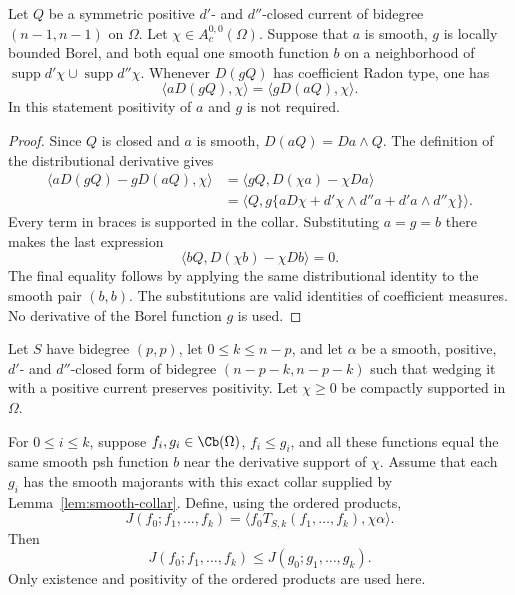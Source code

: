 \begin{lemma}
\label{lem:collar-green}
Let $Q$ be a symmetric positive $d'$- and $d''$-closed current of
bidegree $(n-1,n-1)$ on $\Omega$. Let $\chi\in A_c^{0,0}(\Omega)$.
Suppose that $a$ is smooth, $g$ is locally bounded Borel, and both equal
one smooth function $b$ on a neighborhood of
$\operatorname{supp}d'\chi\cup\operatorname{supp}d''\chi$.
Whenever $D(gQ)$ has coefficient Radon type, one has
\[
 \langle aD(gQ),\chi\rangle
 =\langle gD(aQ),\chi\rangle.
\]
In this statement positivity of $a$ and $g$ is not required.
\end{lemma}

\begin{proof}
Since $Q$ is closed and $a$ is smooth, $D(aQ)=Da\wedge Q$. The
definition of the distributional derivative gives
\begin{align*}
 \langle aD(gQ)-gD(aQ),\chi\rangle
  &=\langle gQ,D(\chi a)-\chi Da\rangle\\
  &=\langle Q,g\{aD\chi+d'\chi\wedge d''a
                         +d'a\wedge d''\chi\}\rangle.
\end{align*}
Every term in braces is supported in the collar. Substituting $a=g=b$
there makes the last expression
\[
 \langle bQ,D(\chi b)-\chi Db\rangle=0.
\]
The final equality follows by applying the same distributional identity
to the smooth pair $(b,b)$. The substitutions are valid identities of
coefficient measures. No derivative of the Borel function $g$ is used.
\end{proof}

\begin{lemma}
\label{lem:trace-monotonicity}
Let $S$ have bidegree $(p,p)$, let $0\leq k\leq n-p$, and let
$\alpha$ be a smooth, positive, $d'$- and $d''$-closed form of bidegree
$(n-p-k,n-p-k)$ such that wedging it with a positive current preserves
positivity. Let $\chi\geq0$ be compactly supported in $\Omega$.

For $0\leq i\leq k$, suppose $f_i,g_i\in\Cb(\Omega)$,
$f_i\leq g_i$, and all these functions equal the same smooth psh
function $b$ near the derivative support of $\chi$. Assume that each
$g_i$ has the smooth majorants with this exact collar supplied by
Lemma~\ref{lem:smooth-collar}. Define, using the ordered products,
\[
 J(f_0;f_1,\ldots,f_k)
   =\langle f_0T_{S,k}(f_1,\ldots,f_k),\chi\alpha\rangle.
\]
Then
\[
 J(f_0;f_1,\ldots,f_k)
 \leq J(g_0;g_1,\ldots,g_k).
\]
Only existence and positivity of the ordered products are used here.
\end{lemma}


